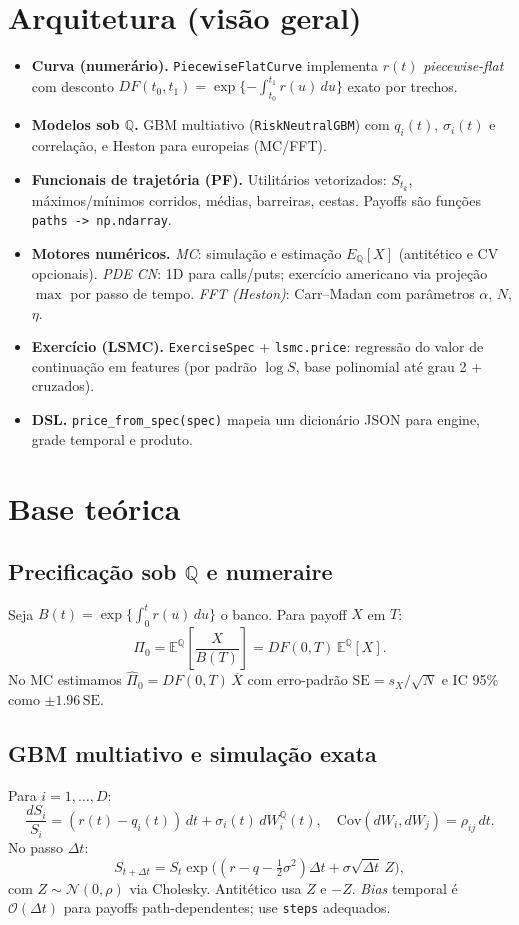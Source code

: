 \documentclass[11pt,a4paper]{article}
\begin{document}
\section{Arquitetura (visão geral)}
\begin{itemize}[leftmargin=1.2em]
\item \textbf{Curva (numerário).} \texttt{PiecewiseFlatCurve} implementa $r(t)$ \emph{piecewise-flat} com desconto
$DF(t_0,t_1)=\exp\{-\int_{t_0}^{t_1} r(u)\,du\}$ exato por trechos.
\item \textbf{Modelos sob $\mathbb{Q}$.} 
GBM multiativo (\texttt{RiskNeutralGBM}) com $q_i(t)$, $\sigma_i(t)$ e correlação, e Heston para europeias (MC/FFT).
\item \textbf{Funcionais de trajetória (PF).} Utilitários vetorizados: $S_{t_k}$, máximos/mínimos corridos, médias, barreiras, cestas.
Payoffs são funções \verb|paths -> np.ndarray|.
\item \textbf{Motores numéricos.} 
\emph{MC}: simulação e estimação $E_{\mathbb Q}[X]$ (antitético e CV opcionais).
\emph{PDE CN}: 1D para calls/puts; exercício americano via projeção $\max$ por passo de tempo.
\emph{FFT (Heston)}: Carr--Madan com parâmetros $\alpha$, $N$, $\eta$.
\item \textbf{Exercício (LSMC).} \texttt{ExerciseSpec} + \texttt{lsmc.price}: regressão do valor de continuação em features (por padrão $\log S$,
base polinomial até grau 2 + cruzados).
\item \textbf{DSL.} \texttt{price\_from\_spec(spec)} mapeia um dicionário JSON para engine, grade temporal e produto.
\end{itemize}

\section{Base teórica}

\subsection{Precificação sob $\mathbb{Q}$ e numeraire}
Seja $B(t)=\exp\{\int_0^t r(u)\,du\}$ o banco. Para payoff $X$ em $T$:
\[
\Pi_0=\mathbb E^{\mathbb Q}\!\left[\frac{X}{B(T)}\right]=DF(0,T)\,\mathbb E^{\mathbb Q}[X].
\]
No MC estimamos $\hat \Pi_0 = DF(0,T)\,\overline{X}$ com erro-padrão 
$\mathrm{SE}=s_X/\sqrt{N}$ e IC 95\% como $\pm 1.96\,\mathrm{SE}$.

\subsection{GBM multiativo e simulação exata}
Para $i=1,\dots,D$:
\[
\frac{dS_i}{S_i}=(r(t)-q_i(t))\,dt+\sigma_i(t)\,dW_i^{\mathbb Q}(t),\quad
\mathrm{Cov}(dW_i,dW_j)=\rho_{ij}\,dt.
\]
No passo $\Delta t$: 
\[
S_{t+\Delta t} = S_t\exp\!\Big((r-q-\tfrac12\sigma^2)\Delta t + \sigma\sqrt{\Delta t}\,Z\Big),
\]
com $Z\sim \mathcal N(0,\rho)$ via Cholesky. Antitético usa $Z$ e $-Z$.
\emph{Bias} temporal é $\mathcal O(\Delta t)$ para payoffs path-dependentes; use \texttt{steps} adequados.
\end{document}
